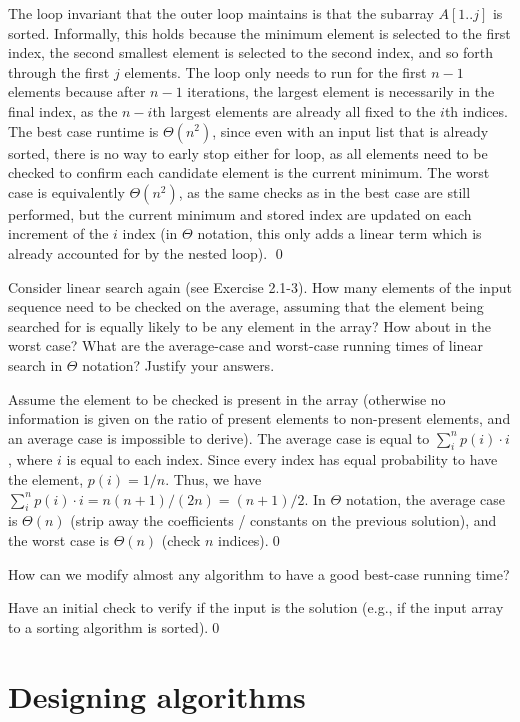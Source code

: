 The loop invariant that the outer loop maintains is that the subarray $A[1..j]$ is sorted. Informally, this holds because the minimum element is selected to the first index, the second smallest element is selected to the second index, and so forth through the first $j$ elements. The loop only needs to run for the first $n-1$ elements because after $n-1$ iterations, the largest element is necessarily in the final index, as the $n-i$th largest elements are already all fixed to the $i$th indices. The best case runtime is $\Theta(n^2)$, since even with an input list that is already sorted, there is no way to early stop either for loop, as all elements need to be checked to confirm each candidate element is the current minimum. The worst case is equivalently $\Theta(n^2)$, as the same checks as in the best case are still performed, but the current minimum and stored index are updated on each increment of the $i$ index (in $\Theta$ notation, this only adds a linear term which is already accounted for by the nested loop).
\qed

 Consider linear search again (see Exercise 2.1-3). How many elements of the input sequence need to be checked on the average, assuming that the element being searched for is equally likely to be any element in the array? How about in the worst case? What are the average-case and worst-case running times of linear search in $\Theta$ notation? Justify your answers.

\sol Assume the element to be checked is present in the array (otherwise no information is given on the ratio of present elements to non-present elements, and an average case is impossible to derive).  The average case is equal to $\sum_i^n p(i) \cdot i$, where $i$ is equal to each index. Since every index has equal probability to have the element, $p(i) = 1/n$. Thus, we have $\sum_i^n p(i) \cdot i = n(n+1) / (2n) = (n+1)/2$. In $\Theta$ notation, the average case is $\Theta(n)$ (strip away the coefficients / constants on the previous solution), and the worst case is $\Theta(n)$ (check $n$ indices).\qed

 How can we modify almost any algorithm to have a good best-case running time?

\sol Have an initial check to verify if the input is the solution (e.g., if the input array to a sorting algorithm is sorted).\qed

\section{Designing algorithms}

